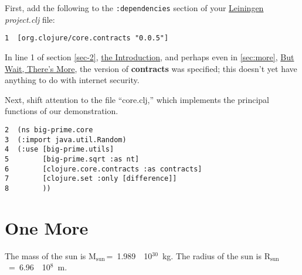 \documentclass[11pt]{article}
\begin{document}
First, add the following to the \verb~:dependencies~ section of your \href{https://github.com/technomancy/leiningen}{Leiningen}
\emph{project.clj} file:

\begin{verbatim}
1  [org.clojure/core.contracts "0.0.5"]
\end{verbatim}

In line 1 of section \ref{sec-2}, \hyperref[sec-2]{the Introduction}, and
perhaps even in \ref{sec:more}, \hyperref[sec:more]{But Wait, There's More}, the version of
\textbf{contracts} was specified; this doesn't yet have anything to do with
internet security.

Next, shift attention to the file ``core.clj,'' which implements the
principal functions of our demonstration.

\begin{verbatim}
2  (ns big-prime.core
3  (:import java.util.Random)
4  (:use [big-prime.utils]
5        [big-prime.sqrt :as nt]
6        [clojure.core.contracts :as contracts]
7        [clojure.set :only [difference]]
8        ))
\end{verbatim}

\section{One More}
\label{sec-3}
\label{sec:more}

The mass of the sun is M$_{\text{sun}~}$=~1.989~\texttimes{}~10$^{\text{30}}$~kg.  The radius of
the sun is R$_{\text{sun}}$~=~6.96~\texttimes{}~10$^{\text{8}}$~m.
\end{document}
